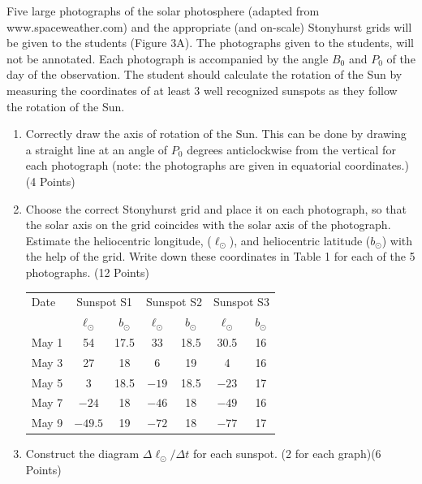 Five large photographs of the solar photosphere (adapted from
www.spaceweather.com) and the appropriate (and on-scale) Stonyhurst grids will
be given to the students (Figure 3A). The photographs given to the students,
will not be annotated. Each photograph is accompanied by the angle $B_0$ and
$P_0$ of the day of the observation. The student should calculate the rotation
of the Sun by measuring the coordinates of at least 3 well recognized sunspots
as they follow the rotation of the Sun.


\begin{enumerate}
\item Correctly draw the axis of rotation of the Sun. This can be done by
  drawing a straight line at an angle of $P_0$ degrees anticlockwise from the
  vertical for each photograph (note: the photographs are given in equatorial
  coordinates.) \hfill(4 Points)
\item Choose the correct Stonyhurst grid and place it on each photograph, so
  that the solar axis on the grid coincides with the solar axis of the
  photograph. Estimate the heliocentric longitude, ($\ell_\odot$), and
  heliocentric latitude ($b_\odot$) with the help of the grid. Write down
  these coordinates in Table 1 for each of the 5
  photographs. \hfill(12 Points)

  \begin{center}
  \begin{tabular}{l cc cc cc}
  \toprule
  Date & \multicolumn{2}{c}{Sunspot S1}
    & \multicolumn{2}{c}{Sunspot S2} & \multicolumn{2}{c}{Sunspot S3}\\
  & $\ell_\odot$ & $b_\odot$ & $\ell_\odot$ & $b_\odot$
    & $\ell_\odot$ & $b_\odot$\\
  \midrule
  May 1 & 54    & 17.5 & 33  & 18.5 & 30.5 & 16\\
  May 3 & 27    & 18   & 6   & 19   & 4    & 16\\
  May 5 & 3     & 18.5 & $-19$ & 18.5 & $-23$ & 17\\
  May 7 & $-24$ & 18   & $-46$ & 18   & $-49$ & 16\\
  May 9 & $-49.5$ & 19 & $-72$ & 18   & $-77$ & 17\\
  \bottomrule
  \end{tabular}
  \end{center}
\item Construct the diagram $\Delta\ell_\odot/\Delta t$ for each sunspot.
  \hfill(2 for each graph)\quad(6 Points)


\end{enumerate}
